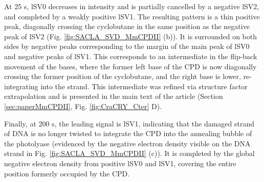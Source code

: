 At 25 \textmu s, lSV0 decreases in intensity and is partially cancelled by a negative lSV2, and completed by a weakly positive lSV1. The resulting pattern is a thin positive peak, diagonally crossing the cyclobutane in the same position as the negative peak of lSV2 (Fig. \ref{fig:SACLA_SVD_MmCPDII} (b)). It is surrounded on both sides by negative peaks corresponding to the margin of the main peak of lSV0 and negative peaks of lSV1. This corresponds to an intermediate in the flip-back movement of the bases, where the former left base of the CPD is now diagonally crossing the former position of the cyclobutane, and the right base is lower, re-integrating into the strand. This intermediate was refined via structure factor extrapolation and is presented in the main text of the article (Section \ref{sec:paperMmCPDII}, Fig. \ref{fig:CraCRY_Cter} D).

Finally, at 200 \textmu s, the leading signal is lSV1, indicating that the damaged strand of DNA is no longer twisted to integrate the CPD into the annealing bubble of the photolyase (evidenced by the negative electron density visible on the DNA strand in Fig. \ref{fig:SACLA_SVD_MmCPDII} (c)). It is completed by the global negative electron density from positive lSV0 and lSV1, covering the entire position formerly occupied by the CPD. 

